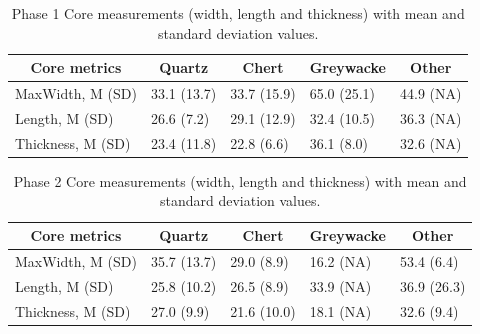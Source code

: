 \documentclass[12pt,twoside]{reedthesis}
\begin{document}
\begin{table}[!h]

\caption{\label{tab:unnamed-chunk-59}Phase 1 Core measurements (width, length and thickness) with mean and standard deviation values.}
\centering
\begin{tabular}[t]{lllll}
\toprule
\multicolumn{1}{c}{\textbf{Core metrics}} & \multicolumn{1}{c}{\textbf{Quartz}} & \multicolumn{1}{c}{\textbf{Chert}} & \multicolumn{1}{c}{\textbf{Greywacke}} & \multicolumn{1}{c}{\textbf{Other}}\\
\midrule
MaxWidth, M (SD) & 33.1 (13.7) & 33.7 (15.9) & 65.0 (25.1) & 44.9 (NA)\\
Length, M (SD) & 26.6 (7.2) & 29.1 (12.9) & 32.4 (10.5) & 36.3 (NA)\\
Thickness, M (SD) & 23.4 (11.8) & 22.8 (6.6) & 36.1 (8.0) & 32.6 (NA)\\
\bottomrule
\end{tabular}
\end{table}
\begin{table}[!h]

\caption{\label{tab:unnamed-chunk-60}Phase 2 Core measurements (width, length and thickness) with mean and standard deviation values.}
\centering
\begin{tabular}[t]{lllll}
\toprule
\multicolumn{1}{c}{\textbf{Core metrics}} & \multicolumn{1}{c}{\textbf{Quartz}} & \multicolumn{1}{c}{\textbf{Chert}} & \multicolumn{1}{c}{\textbf{Greywacke}} & \multicolumn{1}{c}{\textbf{Other}}\\
\midrule
MaxWidth, M (SD) & 35.7 (13.7) & 29.0 (8.9) & 16.2 (NA) & 53.4 (6.4)\\
Length, M (SD) & 25.8 (10.2) & 26.5 (8.9) & 33.9 (NA) & 36.9 (26.3)\\
Thickness, M (SD) & 27.0 (9.9) & 21.6 (10.0) & 18.1 (NA) & 32.6 (9.4)\\
\bottomrule
\end{tabular}
\end{table}
\end{document}

